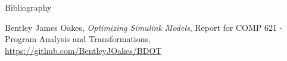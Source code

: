 \documentclass[final,hyperref={pdfpagelabels=false}]{beamer}
\begin{document}
\begin{frame}{}
\begin{columns}[t]
\begin{column}{.385\linewidth}
             \begin{block}{Bibliography}
             \small
     	   \begin{thebibliography}{10} 
     	    Bentley James Oakes, {\em Optimizing Simulink Models}, Report for COMP 621 - Program Analysis and Transformations, \url{https://github.com/BentleyJOakes/BDOT}
          		\end{thebibliography}	   
              	\end{block}
                     
                     
           \end{column}

    \end{columns}

  \end{frame}
\end{document}
